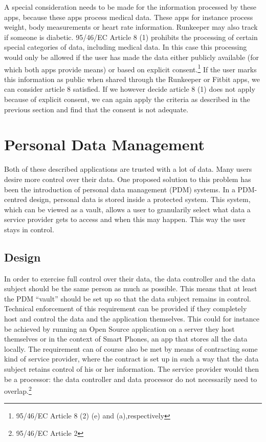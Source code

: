 \documentclass{article}
\begin{document}
A special consideration needs to be made for the information processed by these apps, because these apps process medical data.
These apps for instance process weight, body measurements or heart rate information.
Runkeeper may also track if someone is diabetic.
95/46/EC Article 8 (1) prohibits the processing of certain special categories of data, including medical data.
In this case this processing would only be allowed if the user has made the data either publicly available (for which both apps provide means) or based on explicit consent.\footnote{95/46/EC Article 8 (2) (e) and (a),respectively}
If the user marks this information as public when shared through the Runkeeper or Fitbit apps, we can consider article 8 satisfied.
If we however decide article 8 (1) does not apply because of explicit consent, we can again apply the criteria as described in the previous section and find that the consent is not adequate.

\section{Personal Data Management}

Both of these described applications are trusted with a lot of data.
Many users desire more control over their data.
One proposed solution to this problem has been the introduction of personal data management (PDM) systems.
In a PDM-centred design, personal data is stored inside a protected system.
This system, which can be viewed as a vault, allows a user to granularily select what data a service provider gets to access and when this may happen.
This way the user stays in control.

\subsection{Design}

In order to exercise full control over their data, the data controller and the data subject should be the same person as much as possible.
This means that at least the PDM ``vault'' should be set up so that the data subject remains in control.
Technical enforcement of this requirement can be provided if they completely host and control the data and the application themselves.
This could for instance be achieved by running an Open Source application on a server they host themselves or in the context of Smart Phones, an app that stores all the data locally.
The requirement can of course also be met by means of contracting some kind of service provider, where the contract is set up in such a way that the data subject retains control of his or her information.
The service provider would then be a processor: the data controller and data processor do not necessarily need to overlap.\footnote{95/46/EC Article 2}
\end{document}
